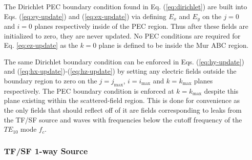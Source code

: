 The Dirichlet PEC boundary condition found in Eq. (\ref{eq:dirichlet}) are built into Eqs. (\ref{eq:ey-update}) and (\ref{eq:ex-update}) via defining $E_x$ and $E_y$ on the $j=0$ and $i=0$ planes respectively inside of the PEC region. Thus after these fields are initialized to zero, they are never updated. No PEC conditions are required for Eq. \ref{eq:ez-update} as the $k=0$ plane is defined to be inside the Mur ABC region.

The same Dirichlet boundary condition can be enforced in Eqs. (\ref{eq:hy-update}) and (\ref{eq:hx-update})-(\ref{eq:hz-update}) by setting any electric fields outside the boundary region to zero on the $j=j_{\max}$, $i=i_{\max}$ and $k=k_{\max}$ planes respectively. The PEC boundary condition is enforced at $k=k_{\max}$ despite this plane existing within the scattered-field region. This is done for convenience as the only fields that should reflect off of it are fields corresponding to leaks from the TF/SF source and waves with frequencies below the cutoff frequency of the $TE_{10}$ mode $f_c$.

\subsubsection{TF/SF 1-way Source}
\label{subsubsec:tfsf-timestep}
